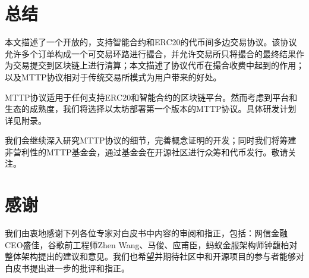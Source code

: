 \documentclass[UTF8,nofonts]{ctexart}
\begin{document}

\section{总结\label{sec:summary}}

本文描述了一个开放的，支持智能合约和ERC20的代币间多边交易协议。该协议允许多个订单构成一个可交易环路进行撮合，并允许交易所只将撮合的最终结果作为交易提交到区块链上进行清算；本文描述了协议代币在撮合收费中起到的作用；以及MTTP协议相对于传统交易所模式为用户带来的好处。

MTTP协议适用于任何支持ERC20和智能合约的区块链平台。然而考虑到平台和生态的成熟度，我们将选择以太坊部署第一个版本的MTTP协议。具体研发计划详见附录。

我们会继续深入研究MTTP协议的细节，完善概念证明的开发；同时我们将筹建非营利性的MTTP基金会，通过基金会在开源社区进行众筹和代币发行。敬请关注。

\section{感谢\label{sec:acknowledgement}}

我们由衷地感谢下列各位专家对白皮书中内容的审阅和指正，包括：网信金融CEO盛佳，谷歌前工程师Zhen Wang、马俊、应甫臣，蚂蚁金服架构师钟馥柏对整体架构提出的建议和意见。我们也希望并期待社区中和开源项目的参与者能够对白皮书提出进一步的批评和指正。

\newpage


\end{document}
